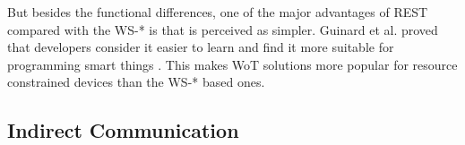 But besides the functional differences, one of the major advantages of REST compared with the WS-* is that is perceived as simpler.
Guinard et al. proved that developers consider it easier to learn and find it more suitable for programming smart things \cite{}.
This makes WoT solutions more popular for resource constrained devices than the WS-* based ones.





\subsection{Indirect Communication}
\label{sec:indirect_communication}


